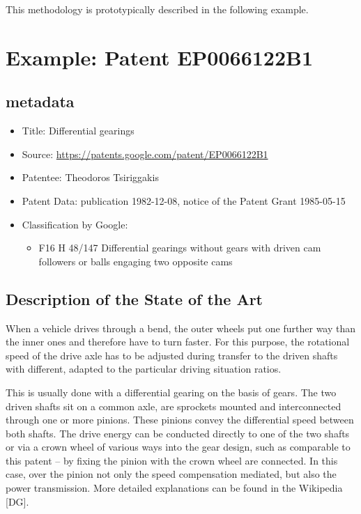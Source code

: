 \documentclass[11pt,a4paper]{article}
\begin{document}
This methodology is prototypically described in the following example.

\section{Example: Patent EP0066122B1}

\subsection{metadata}
\begin{itemize} \itemsep0pt
\item Title: Differential gearings
\item Source: \url{https://patents.google.com/patent/EP0066122B1}
\item Patentee: Theodoros Tsiriggakis
\item Patent Data: publication 1982-12-08, notice of the Patent Grant
  1985-05-15
\item Classification by Google:
  \begin{itemize}
  \item F16 H 48/147 Differential gearings without gears with driven cam
    followers or balls engaging two opposite cams
  \end{itemize}
\end{itemize}

\subsection{Description of the State of the Art}

When a vehicle drives through a bend, the outer wheels put one further way
than the inner ones and therefore have to turn faster.  For this purpose, the
rotational speed of the drive axle has to be adjusted during transfer to the
driven shafts with different, adapted to the particular driving situation
ratios.

This is usually done with a differential gearing on the basis of gears. The
two driven shafts sit on a common axle, are sprockets mounted and
interconnected through one or more pinions. These pinions convey the
differential speed between both shafts. The drive energy can be conducted
directly to one of the two shafts or via a crown wheel of various ways into
the gear design, such as comparable to this patent -- by fixing the pinion
with the crown wheel are connected. In this case, over the pinion not only the
speed ​​compensation mediated, but also the power transmission. More detailed
explanations can be found in the Wikipedia [DG].
\end{document}
